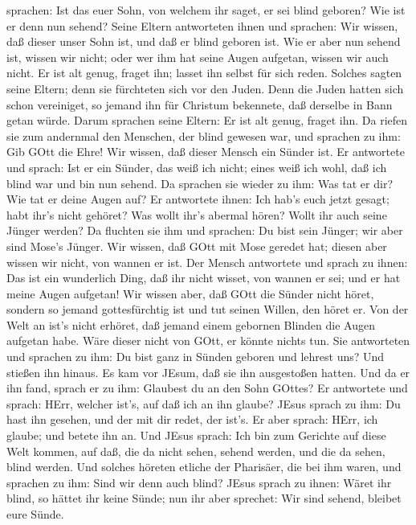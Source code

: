 sprachen: Ist das euer Sohn, von welchem ihr saget, er sei blind
geboren? Wie ist er denn nun sehend?  Seine Eltern
antworteten ihnen und sprachen: Wir wissen, daß dieser unser Sohn ist,
und daß er blind geboren ist.  Wie er aber nun sehend ist,
wissen wir nicht; oder wer ihm hat seine Augen aufgetan, wissen wir auch
nicht. Er ist alt genug, fraget ihn; lasset ihn selbst für sich reden.
 Solches sagten seine Eltern; denn sie fürchteten sich vor
den Juden. Denn die Juden hatten sich schon vereiniget, so jemand ihn
für Christum bekennete, daß derselbe in Bann getan würde. 
Darum sprachen seine Eltern: Er ist alt genug, fraget ihn. 
Da riefen sie zum andernmal den Menschen, der blind gewesen war, und
sprachen zu ihm: Gib GOtt die Ehre! Wir wissen, daß dieser Mensch ein
Sünder ist.  Er antwortete und sprach: Ist er ein Sünder,
das weiß ich nicht; eines weiß ich wohl, daß ich blind war und bin nun
sehend.  Da sprachen sie wieder zu ihm: Was tat er dir? Wie
tat er deine Augen auf?  Er antwortete ihnen: Ich hab's
euch jetzt gesagt; habt ihr's nicht gehöret? Was wollt ihr's abermal
hören? Wollt ihr auch seine Jünger werden?  Da fluchten sie
ihm und sprachen: Du bist sein Jünger; wir aber sind Mose's Jünger.
 Wir wissen, daß GOtt mit Mose geredet hat; diesen aber
wissen wir nicht, von wannen er ist.  Der Mensch antwortete
und sprach zu ihnen: Das ist ein wunderlich Ding, daß ihr nicht wisset,
von wannen er sei; und er hat meine Augen aufgetan!  Wir
wissen aber, daß GOtt die Sünder nicht höret, sondern so jemand
gottesfürchtig ist und tut seinen Willen, den höret er. 
Von der Welt an ist's nicht erhöret, daß jemand einem gebornen Blinden
die Augen aufgetan habe.  Wäre dieser nicht von GOtt, er
könnte nichts tun.  Sie antworteten und sprachen zu ihm: Du
bist ganz in Sünden geboren und lehrest uns? Und stießen ihn hinaus.
 Es kam vor JEsum, daß sie ihn ausgestoßen hatten. Und da
er ihn fand, sprach er zu ihm: Glaubest du an den Sohn GOttes?
 Er antwortete und sprach: HErr, welcher ist's, auf daß ich
an ihn glaube?  JEsus sprach zu ihm: Du hast ihn gesehen,
und der mit dir redet, der ist's.  Er aber sprach: HErr,
ich glaube; und betete ihn an.  Und JEsus sprach: Ich bin
zum Gerichte auf diese Welt kommen, auf daß, die da nicht sehen, sehend
werden, und die da sehen, blind werden.  Und solches
höreten etliche der Pharisäer, die bei ihm waren, und sprachen zu ihm:
Sind wir denn auch blind?  JEsus sprach zu ihnen: Wäret ihr
blind, so hättet ihr keine Sünde; nun ihr aber sprechet: Wir sind
sehend, bleibet eure Sünde.

